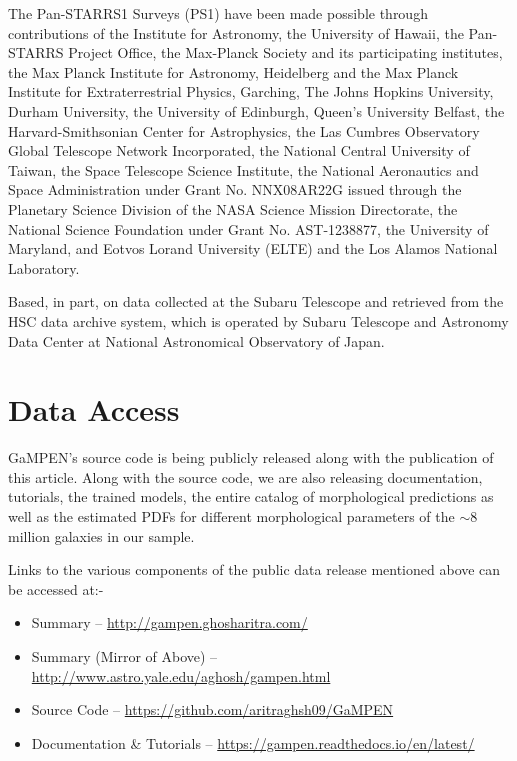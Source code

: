 \documentclass[linenumbers,twocolumn,twocolappendix]{aastex631}
\begin{document}
\begin{CJK*}{UTF8}{gbsn}
The Pan-STARRS1 Surveys (PS1) have been made possible through contributions of the Institute for Astronomy, the University of Hawaii, the Pan-STARRS Project Office, the Max-Planck Society and its participating institutes, the Max Planck Institute for Astronomy, Heidelberg and the Max Planck Institute for Extraterrestrial Physics, Garching, The Johns Hopkins University, Durham University, the University of Edinburgh, Queen’s University Belfast, the Harvard-Smithsonian Center for Astrophysics, the Las Cumbres Observatory Global Telescope Network Incorporated, the National Central University of Taiwan, the Space Telescope Science Institute, the National Aeronautics and Space Administration under Grant No. NNX08AR22G issued through the Planetary Science Division of the NASA Science Mission Directorate, the National Science Foundation under Grant No. AST-1238877, the University of Maryland, and Eotvos Lorand University (ELTE) and the Los Alamos National Laboratory.


Based, in part, on data collected at the Subaru Telescope and retrieved from the HSC data archive system, which is operated by Subaru Telescope and Astronomy Data Center at National Astronomical Observatory of Japan.

\clearpage

\appendix

\section{Data Access}\label{sec:ap:data_access}

GaMPEN's source code is being publicly released along with the publication of this article. Along with the source code, we are also releasing documentation, tutorials, the trained models, the entire catalog of morphological predictions as well as the estimated PDFs for different morphological parameters of the $\sim8$ million galaxies in our sample. 

\vspace{10pt}
Links to the various components of the public data release mentioned above can be accessed at:-
\begin{itemize}
    \item Summary -- \href{http://gampen.ghosharitra.com/}{\url{http://gampen.ghosharitra.com/}}
    \item Summary (Mirror of Above) --\href{http://www.astro.yale.edu/aghosh/gampen.html}{\url{http://www.astro.yale.edu/aghosh/gampen.html}}
    \item Source Code --
    \href{https://github.com/aritraghsh09/GaMPEN}{\url{https://github.com/aritraghsh09/GaMPEN}}
    \item Documentation \& Tutorials -- 
    \href{https://gampen.readthedocs.io/en/latest/}{\url{https://gampen.readthedocs.io/en/latest/}}
\end{itemize}


\end{CJK*}
\end{document}
